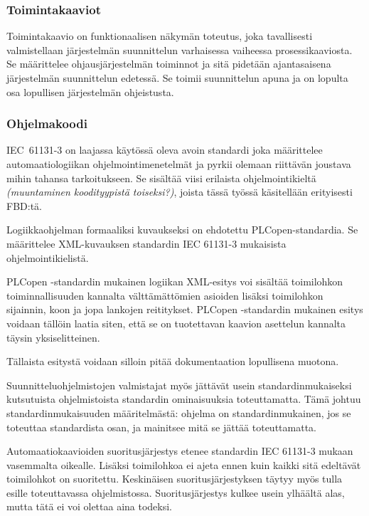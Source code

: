 \documentclass[finnish,12pt]{article}
\begin{document}
		\subsubsection{Toimintakaaviot}

Toimintakaavio on funktionaalisen näkymän toteutus, joka tavallisesti valmistellaan järjestelmän suunnittelun varhaisessa vaiheessa prosessikaaviosta.
Se määrittelee ohjausjärjestelmän toiminnot ja sitä pidetään ajantasaisena järjestelmän suunnittelun edetessä.
Se toimii suunnittelun apuna ja on lopulta osa lopullisen järjestelmän ohjeistusta.


		\subsubsection{Ohjelmakoodi}

IEC~61131-3 on laajassa käytössä oleva avoin standardi joka määrittelee automaatiologiikan ohjelmointimenetelmät ja  pyrkii olemaan riittävän joustava mihin tahansa tarkoitukseen.
Se sisältää viisi erilaista ohjelmointikieltä \emph{(muuntaminen koodityypistä toiseksi?)}, joista tässä työssä käsitellään erityisesti FBD:tä.

Logiikkaohjelman formaaliksi kuvaukseksi on ehdotettu PLCopen-standardia.
Se määrittelee XML-kuvauksen standardin IEC 61131-3 mukaisista ohjelmointikielistä.

PLCopen -standardin mukainen logiikan XML-esitys voi sisältää toimilohkon toiminnallisuuden kannalta välttämättömien asioiden lisäksi toimilohkon sijainnin, koon ja jopa lankojen reititykset.
PLCopen -standardin mukainen esitys voidaan tällöin laatia siten, että se on tuotettavan kaavion asettelun kannalta täysin yksiselitteinen.

Tällaista esitystä voidaan silloin pitää dokumentaation lopullisena muotona.

Suunnitteluohjelmistojen valmistajat myös jättävät usein standardinmukaiseksi kutsutuista ohjelmistoista standardin ominaisuuksia toteuttamatta.\cite{RefWorks:42}
Tämä johtuu standardinmukaisuuden määritelmästä: ohjelma on standardinmukainen, jos se toteuttaa standardista osan, ja mainitsee mitä se jättää toteuttamatta. 

Automaatiokaavioiden suoritusjärjestys etenee standardin IEC 61131-3 mukaan
vasemmalta oikealle. Lisäksi toimilohkoa ei ajeta ennen kuin kaikki sitä edeltävät toimilohkot on suoritettu.
Keskinäisen suoritusjärjestyksen täytyy myös tulla esille toteuttavassa ohjelmistossa.
Suoritusjärjestys kulkee usein ylhäältä alas, mutta tätä ei voi olettaa aina todeksi.
\end{document}
